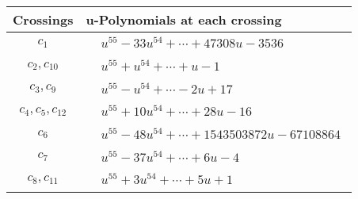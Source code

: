 \documentclass[1p]{elsarticle_modified}
\theoremstyle{definition}
\begin{document}
\begin{tabular}{m{50pt}|m{274pt}}
Crossings & \hspace{64pt}u-Polynomials at each crossing \\
\hline $$\begin{aligned}c_{1}\end{aligned}$$&$\begin{aligned}
&u^{55}-33 u^{54}+\cdots+47308 u-3536
\end{aligned}$\\
\hline $$\begin{aligned}c_{2},c_{10}\end{aligned}$$&$\begin{aligned}
&u^{55}+u^{54}+\cdots+u-1
\end{aligned}$\\
\hline $$\begin{aligned}c_{3},c_{9}\end{aligned}$$&$\begin{aligned}
&u^{55}- u^{54}+\cdots-2 u+17
\end{aligned}$\\
\hline $$\begin{aligned}c_{4},c_{5},c_{12}\end{aligned}$$&$\begin{aligned}
&u^{55}+10 u^{54}+\cdots+28 u-16
\end{aligned}$\\
\hline $$\begin{aligned}c_{6}\end{aligned}$$&$\begin{aligned}
&u^{55}-48 u^{54}+\cdots+1543503872 u-67108864
\end{aligned}$\\
\hline $$\begin{aligned}c_{7}\end{aligned}$$&$\begin{aligned}
&u^{55}-37 u^{54}+\cdots+6 u-4
\end{aligned}$\\
\hline $$\begin{aligned}c_{8},c_{11}\end{aligned}$$&$\begin{aligned}
&u^{55}+3 u^{54}+\cdots+5 u+1
\end{aligned}$\\
\hline
\end{tabular}\\~\\
\newpage\renewcommand{\arraystretch}{1}
\end{document}
